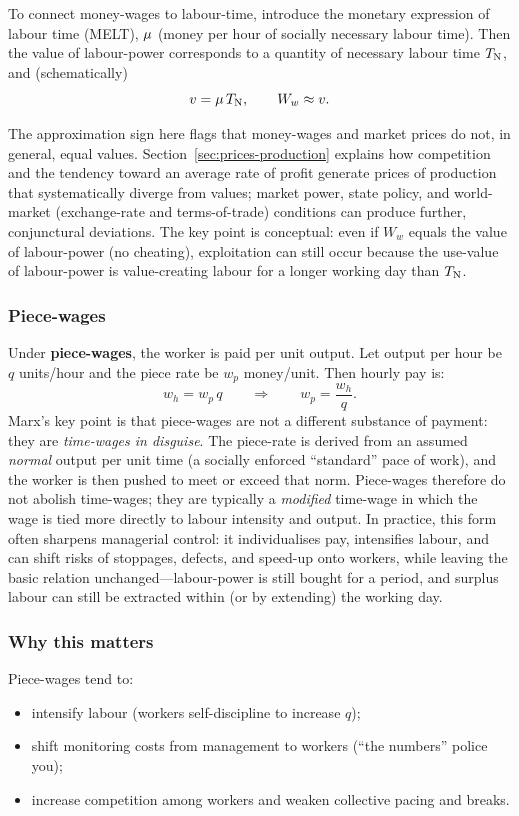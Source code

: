 To connect money-wages to labour-time, introduce the monetary expression of labour time
(MELT), $\mu$ (money per hour of socially necessary labour time). Then the value of
labour-power corresponds to a quantity of necessary labour time $T_{\mathrm{N}}$, and (schematically)
\[
  v = \mu \, T_{\mathrm{N}},
  \qquad
  W_w \approx v.
\]

The approximation sign here flags that money-wages and market prices do not, in general,
equal values. Section~\ref{sec:prices-production} explains how competition and the tendency
toward an average rate of profit generate prices of production that systematically diverge
from values; market power, state policy, and world-market (exchange-rate and terms-of-trade)
conditions can produce further, conjunctural deviations. The key point is conceptual: even
if $W_w$ equals the value of labour-power (no cheating), exploitation can still occur because
the use-value of labour-power is value-creating labour for a longer working day than $T_{\mathrm{N}}$.


\subsubsection*{Piece-wages}

Under \textbf{piece-wages}, the worker is paid per unit output. Let output per hour be
$q$ units/hour and the piece rate be $w_p$ money/unit. Then hourly pay is:
\[
  w_h = w_p \, q
  \qquad\Rightarrow\qquad
  w_p = \frac{w_h}{q}.
\]
Marx’s key point is that piece-wages are not a different substance of payment: they are
\emph{time-wages in disguise}. The piece-rate is derived from an assumed \emph{normal} output
per unit time (a socially enforced ``standard'' pace of work), and the worker is then pushed
to meet or exceed that norm. Piece-wages therefore do not abolish time-wages; they are typically
a \emph{modified} time-wage in which the wage is tied more directly to labour intensity and output.
In practice, this form often sharpens managerial control: it individualises pay, intensifies labour,
and can shift risks of stoppages, defects, and speed-up onto workers, while leaving the basic relation
unchanged---labour-power is still bought for a period, and surplus labour can still be extracted within
(or by extending) the working day.


\subsubsection*{Why this matters}

Piece-wages tend to:
\begin{itemize}[leftmargin=1.5em]
  \item intensify labour (workers self-discipline to increase $q$);
  \item shift monitoring costs from management to workers (``the numbers'' police you);
  \item increase competition among workers and weaken collective pacing and breaks.
\end{itemize}

